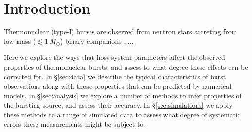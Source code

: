 \documentclass{aastex61}
\begin{document}

\section{Introduction} \label{sec:intro}

Thermonuclear (type-I) bursts are observed from neutron stars accreting from low-mass ($\lesssim 1\ M_\odot$) binary companions \cite[e.g.][]{gal17b}. ...

Here we explore the ways that host system  parameters affect the observed properties of thermonuclear bursts, and assess to what degree these effects can be corrected for.
%
In \S\ref{sec:data} we describe the typical characteristics of burst observations along with those properties that can be predicted by numerical models.
% 
In \S\ref{sec:analysis} we explore a number of methods to infer properties of the bursting source, and assess their accuracy.
%
In \S\ref{sec:simulations} we apply these methods to a range of simulated data to assess what degree of systematic errors these measurements might be subject to.
\end{document}
